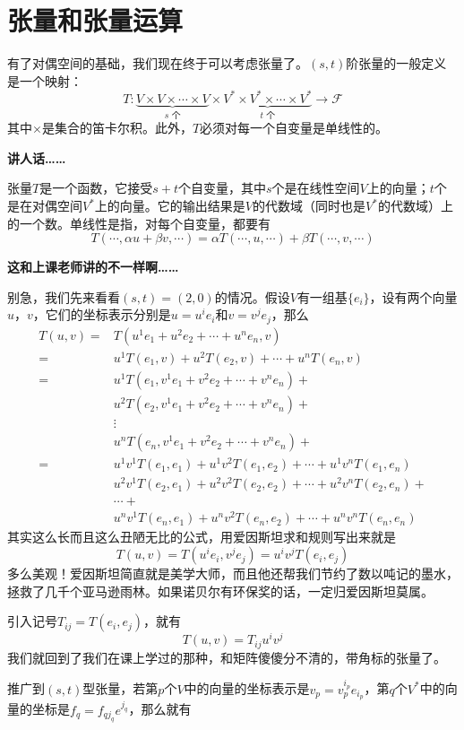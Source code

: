 \documentclass[a4paper,11pt]{ctexart}
\newcommand{\beq}{\begin{equation}}
\newcommand{\eeq}{\end{equation}}
\newcommand{\bea}{\begin{equation}\begin{aligned}}
\newcommand{\eea}{\end{aligned}\end{equation}}
\newcommand{\field}{\mathscr{F}}
\begin{document}
\section{张量和张量运算}
有了对偶空间的基础，我们现在终于可以考虑张量了。$(s,t)$阶张量的一般定义是一个映射：
\beq
T:\underbrace{V\times V\times \cdots \times V}_{s\text{ 个}} \times  \underbrace{V^* \times V^* \times \cdots \times V^*}_{t\text{ 个}} \to \field
\eeq
其中$\times$是集合的笛卡尔积。此外，$T$必须对每一个自变量是单线性的。
\par
\textbf{讲人话……}
\par
张量$T$是一个函数，它接受$s+t$个自变量，其中$s$个是在线性空间$V$上的向量；$t$个是在对偶空间$V^*$上的向量。它的输出结果是$V$的代数域（同时也是$V^*$的代数域）上的一个数。单线性是指，对每个自变量，都要有
\beq
T(\cdots,\alpha u +\beta v,\cdots) = \alpha T(\cdots,u,\cdots) +\beta T(\cdots,v,\cdots)
\eeq
\par
\textbf{这和上课老师讲的不一样啊……}
\par
别急，我们先来看看$(s,t) = (2,0)$的情况。假设$V$有一组基$\{e_i\}$，设有两个向量$u$，$v$，它们的坐标表示分别是$u = u^i e_i$和$v = v^j e_j$，那么
\bea
T(u,v) = &T(u^1 e_1 +u^2 e_2 + \cdots + u^n e_n, v) \\
= &u^1 T(e_1,v) + u^2 T(e_2,v) +\cdots+ u^n T(e_n,v) \\
=  &u^1 T(e_1,v^1 e_1 + v^2 e_2 +\cdots + v^n e_n) +  \\
&u^2 T(e_2,v^1 e_1 + v^2 e_2+\cdots + v^n e_n) +  \\
&\vdots \\
&u^n T(e_n,v^1 e_1 + v^2 e_2+\cdots + v^n e_n) +  \\
=
&u^1v^1T(e_1,e_1)  + u^1v^2T(e_1,e_2) + \cdots + u^1v^n T(e_1,e_n) \\
&u^2v^1T(e_2,e_1) + u^2v^2T(e_2,e_2) + \cdots + u^2v^n T(e_2,e_n) + \\ &\cdots + \\
&u^nv^1T(e_n,e_1) + u^nv^2T(e_n,e_2) + \cdots + u^nv^n T(e_n,e_n) 
\eea
其实这么长而且这么丑陋无比的公式，用爱因斯坦求和规则写出来就是
\beq
T(u,v) = T(u^ie_i,v^je_j) = u^i v^j T(e_i,e_j)
\eeq
多么美观！爱因斯坦简直就是美学大师，而且他还帮我们节约了数以吨记的墨水，拯救了几千个亚马逊雨林。如果诺贝尔有环保奖的话，一定归爱因斯坦莫属。
\par
引入记号$T_{ij} = T(e_i,e_j)$，就有
\beq
T(u,v) = T_{ij} u^i v^j
\eeq
我们就回到了我们在课上学过的那种，和矩阵傻傻分不清的，带角标的张量了。
\par
推广到$(s,t)$型张量，若第$p$个$V$中的向量的坐标表示是$v_p = v_p^{i_p}e_{i_p}$，第$q$个$V^*$中的向量的坐标是$f_q = f_{q{j_q}} e^{j_q}$，那么就有
\end{document}
